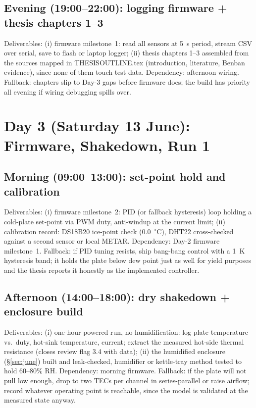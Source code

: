 \documentclass[11pt,a4paper]{article}
\newcommand{\f}[1]{{\ttfamily\def\_{\textunderscore\allowbreak}#1}}
\begin{document}
\subsection*{Evening (19:00--22:00): logging firmware + thesis chapters 1--3}
Deliverables: (i) firmware milestone~1: read all sensors at 5~s period, stream
CSV over serial, save to flash or laptop logger; (ii) thesis chapters 1--3
assembled from the sources mapped in \f{THESIS\_OUTLINE.tex} (introduction,
literature, Benban evidence), since none of them touch test data. Dependency:
afternoon wiring. Fallback: chapters slip to Day-3 gaps before firmware does;
the build has priority all evening if wiring debugging spills over.

\section{Day 3 (Saturday 13 June): Firmware, Shakedown, Run 1}

\subsection*{Morning (09:00--13:00): set-point hold and calibration}
Deliverables: (i) firmware milestone~2: PID (or fallback hysteresis) loop
holding a cold-plate set-point via PWM duty, anti-windup at the current limit;
(ii) calibration record: DS18B20 ice-point check (0.0~$^{\circ}$C), DHT22
cross-checked against a second sensor or local METAR. Dependency: Day-2
firmware milestone~1. Fallback: if PID tuning resists, ship bang-bang control
with a 1~K hysteresis band; it holds the plate below dew point just as well
for yield purposes and the thesis reports it honestly as the implemented
controller.

\subsection*{Afternoon (14:00--18:00): dry shakedown + enclosure build}
Deliverables: (i) one-hour powered run, no humidification: log plate
temperature vs.\ duty, hot-sink temperature, current; extract the measured
hot-side thermal resistance (closes review flag 3.4 with data); (ii) the
humidified enclosure (\S\ref{sec:june}) built and leak-checked, humidifier or
kettle-tray method tested to hold 60--80\% RH. Dependency: morning firmware.
Fallback: if the plate will not pull low enough, drop to two TECs per channel
in series-parallel or raise airflow; record whatever operating point is
reachable, since the model is validated at the measured state anyway.
\end{document}
